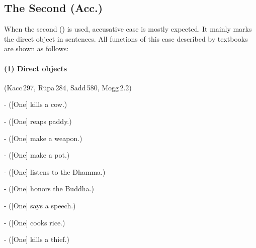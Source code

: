 {}
\subsection*{The Second  (Acc.)}

When the second ()  is used, accusative case is mostly expected. It mainly marks the direct object in sentences. All functions of this case described by textbooks are shown as follows:

\paragraph*{(1) Direct objects} (Kacc\,297, R\=upa\,284, Sadd\,580, Mogg\,2.2)\par 
-  ([One] kills a cow.)\par
-  ([One] reaps paddy.)\par
-  ([One] make a weapon.)\par
-  ([One] make a pot.)\par
-  ([One] listens to the Dhamma.)\par
-  ([One] honors the Buddha.)\par
-  ([One] says a speech.)\par
-  ([One] cooks rice.)\par
-  ([One] kills a thief.)\par

